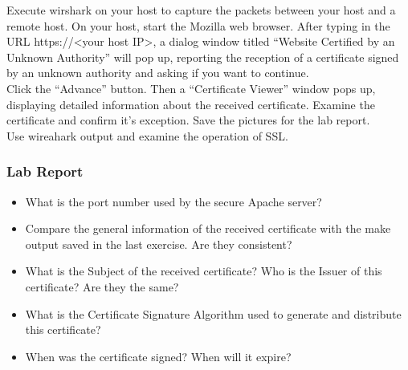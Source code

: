 \documentclass[10pt,a4paper]{article}
\numberwithin{equation}{section}
\numberwithin{figure}{section}
\numberwithin{table}{section}
\begin{document}
Execute wirshark on your host  to capture the packets between your host and a remote host. On your host, start the Mozilla web browser. After typing in the URL https://<your host IP>, a dialog window titled “Website Certified by an Unknown Authority” will pop up, reporting the reception of a certificate signed by an unknown authority and asking if you want to continue. \\

Click the “Advance” button. Then a “Certificate Viewer” window pops up, displaying detailed information about the received certificate. Examine the certificate and confirm it's exception. Save the pictures for the lab report. \\

Use wireahark output and examine the operation of SSL.

\subsubsection*{ Lab Report}
\begin{itemize}
	\setlength{\itemindent}{0pt}
	\item What is the port number used by the secure Apache server?
	\item Compare the general information of the received certificate with the make output saved in the last exercise. Are they consistent?
	\item What is the Subject of the received certificate? Who is the Issuer of this certificate? Are they the same?
	\item What is the Certificate Signature Algorithm used to generate and distribute this certificate?
	\item When was the certificate signed? When will it expire?
\end{itemize}
\end{document}
